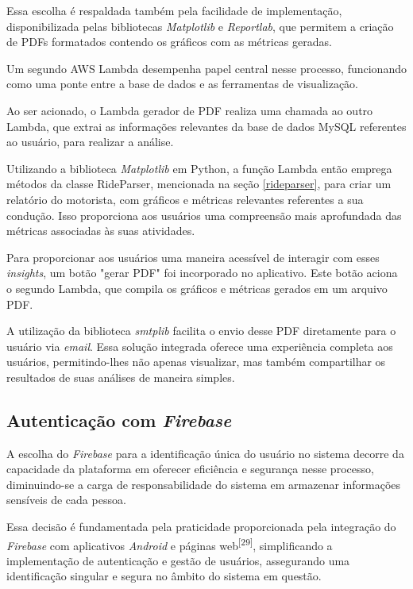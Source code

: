     Essa escolha é respaldada também pela facilidade de implementação, disponibilizada pelas bibliotecas \textit{Matplotlib} e \textit{Reportlab}, que permitem a criação de PDFs formatados contendo os gráficos com as métricas geradas.
    
    Um segundo AWS Lambda desempenha papel central nesse processo, funcionando como uma ponte entre a base de dados e as ferramentas de visualização. 
    
    Ao ser acionado, o Lambda gerador de PDF realiza uma chamada ao outro Lambda, que extrai as informações relevantes da base de dados MySQL referentes ao usuário, para realizar a análise.

    Utilizando a biblioteca \textit{Matplotlib} em Python, a função Lambda então emprega métodos da classe RideParser, mencionada na seção \ref{rideparser}, para criar um relatório do motorista, com gráficos e métricas relevantes referentes a sua condução. Isso proporciona aos usuários uma compreensão mais aprofundada das métricas associadas às suas atividades.
    
    Para proporcionar aos usuários uma maneira acessível de interagir com esses \textit{insights}, um botão "gerar PDF" foi incorporado no aplicativo. Este botão aciona o segundo Lambda, que compila os gráficos e métricas gerados em um arquivo PDF. 
    
    A utilização da biblioteca \textit{smtplib} facilita o envio desse PDF diretamente para o usuário via \textit{email}. Essa solução integrada oferece uma experiência completa aos usuários, permitindo-lhes não apenas visualizar, mas também compartilhar os resultados de suas análises de maneira simples.    

    \subsection{Autenticação com \textit{Firebase}}

    A  escolha do \textit{Firebase} para a identificação única do usuário no sistema decorre da capacidade da plataforma em oferecer eficiência e segurança nesse processo, diminuindo-se a carga de responsabilidade do sistema em armazenar informações sensíveis de cada pessoa. 
    
    Essa decisão é fundamentada pela praticidade proporcionada pela integração do \textit{Firebase} com aplicativos \textit{Android} e páginas web\textsuperscript{[29]}, simplificando a implementação de autenticação e gestão de usuários, assegurando uma identificação singular e segura no âmbito do sistema em questão.

